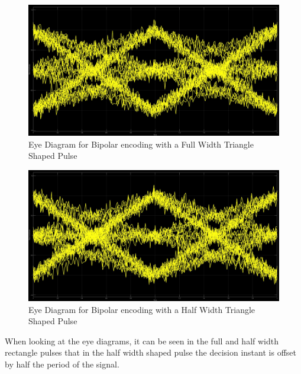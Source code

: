 \documentclass{article}
\begin{document}
\begin{figure}[H]
  \includegraphics[width = \linewidth]{BP_Tri_F_Eye.jpg}
  \caption{Eye Diagram for Bipolar encoding with a Full Width Triangle Shaped Pulse}
  \label{fig:BP-Tri-F-Eye}
\end{figure}
\begin{figure}[H]
  \includegraphics[width = \linewidth]{BP_Tri_H_Eye.jpg}
  \caption{Eye Diagram for Bipolar encoding with a Half Width Triangle Shaped Pulse}
  \label{fig:BP-Tri-H-Eye}
\end{figure}
When looking at the eye diagrams, it can be seen in the full and half width rectangle pulses that in the half width shaped pulse the decision instant is offset by half the period of the signal.
\end{document}
